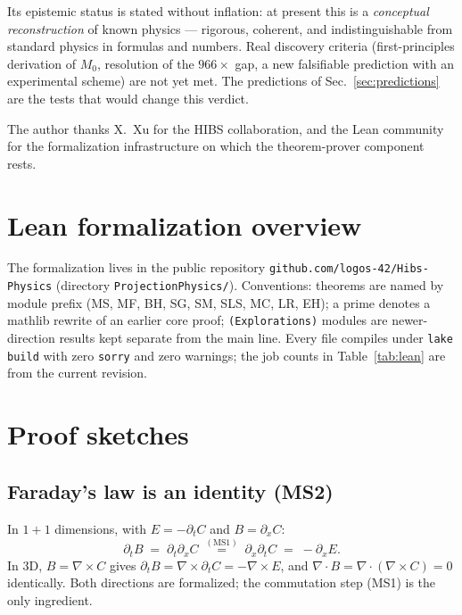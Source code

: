\documentclass[aps,prd,preprint,superscriptaddress,amsmath,amssymb]{revtex4-2}
\begin{document}
Its epistemic status is stated without inflation: at present this is a
\emph{conceptual reconstruction} of known physics --- rigorous, coherent,
and indistinguishable from standard physics in formulas and numbers.  Real
discovery criteria (first-principles derivation of $M_0$, resolution of the
$966\times$ gap, a new falsifiable prediction with an experimental scheme)
are not yet met.  The predictions of Sec.~\ref{sec:predictions} are the
tests that would change this verdict.

\begin{acknowledgments}
The author thanks X.~Xu for the HIBS collaboration, and the Lean community
for the formalization infrastructure on which the theorem-prover component
rests.
\end{acknowledgments}



\appendix

\section{Lean formalization overview}\label{app:lean}

The formalization lives in the public repository
\texttt{github.com/logos-42/Hibs-Physics} (directory
\texttt{ProjectionPhysics/}).  Conventions: theorems are named by module
prefix (MS, MF, BH, SG, SM, SLS, MC, LR, EH); a prime denotes a mathlib
rewrite of an earlier core proof; \texttt{(Explorations)} modules are
newer-direction results kept separate from the main line.  Every file
compiles under \texttt{lake build} with zero \texttt{sorry} and zero
warnings; the job counts in Table~\ref{tab:lean} are from the current
revision.

\section{Proof sketches}\label{app:proofs}

\subsection{Faraday's law is an identity (MS2)}\label{app:faraday}

In $1{+}1$ dimensions, with $E=-\partial_t C$ and $B=\partial_x C$:
\[
\partial_t B \;=\; \partial_t\partial_x C
\;\overset{\mathrm{(MS1)}}{=}\;
\partial_x\partial_t C \;=\; -\partial_x E .
\]
In 3D, $B=\nabla\times C$ gives $\partial_t B=\nabla\times\partial_t C
=-\nabla\times E$, and $\nabla\cdot B=\nabla\cdot(\nabla\times C)=0$
identically.  Both directions are formalized; the commutation step (MS1) is
the only ingredient.
\end{document}
